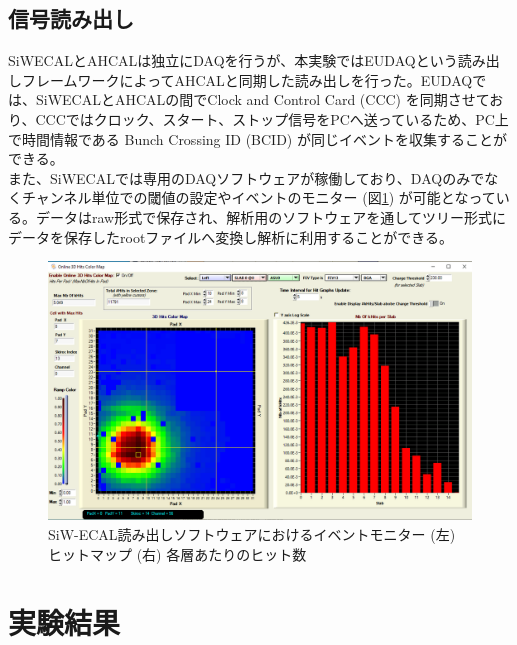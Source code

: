 \subsection{信号読み出し}
SiWECALとAHCALは独立にDAQを行うが、本実験ではEUDAQという読み出しフレームワークによってAHCALと同期した読み出しを行った。EUDAQでは、SiWECALとAHCALの間でClock and Control Card (CCC) を同期させており、CCCではクロック、スタート、ストップ信号をPCへ送っているため、PC上で時間情報である Bunch Crossing ID (BCID) が同じイベントを収集することができる。\\
また、SiWECALでは専用のDAQソフトウェア\cite{ecalsoft}が稼働しており、DAQのみでなくチャンネル単位での閾値の設定やイベントのモニター (図\ref{monitor}) が可能となっている。データはraw形式で保存され、解析用のソフトウェアを通してツリー形式にデータを保存したrootファイルへ変換し解析に利用することができる。
\begin{figure}[H]
\begin{center}
 \includegraphics[keepaspectratio, scale=0.2]
 	{Figure/Beamtest/monitor.png}
 		\caption{SiW-ECAL読み出しソフトウェアにおけるイベントモニター (左) ヒットマップ (右) 各層あたりのヒット数}
		\label{monitor}
\end{center}
\end{figure}
\section{実験結果}
